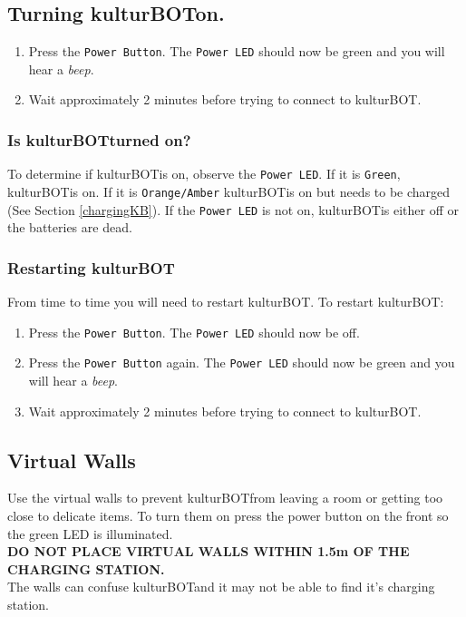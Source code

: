 \documentclass[]{article}
\newcommand{\kb}{kulturBOT}
\newcommand{\kbspace}{\kb \space}
\begin{document}
\subsection{Turning \kbspace on.}
\begin{enumerate}
\item Press the \texttt{Power Button}. The \texttt{Power LED} should now be green and you will hear a \textit{beep}.
\item Wait approximately 2 minutes before trying to connect to \kb.
\end{enumerate}

\subsubsection{Is \kbspace turned on?}
\label{isKbOn}
To determine if \kbspace is on, observe the \texttt{Power LED}. If it is \texttt{Green}, \kbspace is on. If it is \texttt{Orange/Amber} \kbspace is on but needs to be charged (See Section \ref{chargingKB}). If the \texttt{Power LED} is not on, \kbspace is either off or the batteries are dead.

\subsubsection{Restarting \kb}
\label{restartKb}
From time to time you will need to restart \kbspace. To restart \kb:

\begin{enumerate}
\item Press the \texttt{Power Button}. The \texttt{Power LED} should now be off.
\item Press the \texttt{Power Button} again. The \texttt{Power LED} should now be green and you will hear a \textit{beep}.
\item Wait approximately 2 minutes before trying to connect to \kb.
\end{enumerate}

\subsection{Virtual Walls}
Use the virtual walls to prevent \kbspace from leaving a room or getting too close to delicate items. To turn them on press the power button on the front so the green LED is illuminated.\\
\textbf{DO NOT PLACE VIRTUAL WALLS WITHIN 1.5m OF THE CHARGING STATION.} \\ The walls can confuse \kbspace and it may not be able to find it's charging station. 
\\
\end{document}

